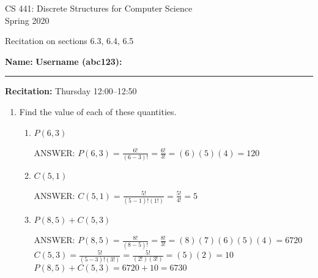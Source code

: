 \documentclass[12pt]{article}
\newcommand\buf{\vspace{0.10in}}
\newenvironment{answer}{\fontfamily{ptm}\selectfont \smaller[1] ANSWER: }{}
\begin{document}
\begin{center}
CS 441: Discrete Structures for Computer Science \\
{\smaller[1] Spring 2020} \\

\vspace {0.25in}

Recitation on sections 6.3, 6.4, 6.5
\end{center}

\vspace{0.25in}

{\smaller[1]
\textbf{Name:} \hrulefill
\hspace{1em}
\textbf{Username (abc123):} \rule{1.25in}{0.4pt}

\null \textbf{Recitation:}
\hfill
Thursday 12:00--12:50 \hfill
}

\begin{enumerate} %


\item Find the value of each of these quantities.

\begin{enumerate}

    \item $P(6, 3)$
    \buf

    \begin{answer}
        $P(6,3) = \frac{6!}{(6-3)!} = \frac{6!}{3!} = (6)(5)(4) = 120$
    \end{answer}
    \buf

    \item $C(5, 1)$
    \buf

    \begin{answer}
        $C(5, 1) = \frac{5!}{(5-1)!(1!)} = \frac{5!}{4!} = 5$
    \end{answer}
    \buf

    \item $P(8, 5) + C(5, 3)$
    \buf

    \begin{answer}
        $P(8,5) = \frac{8!}{(8-5)!} = \frac{8!}{3!} = (8)(7)(6)(5)(4) = 6720$
        $C(5,3) = \frac{5!}{(5-3)!(3!)} = \frac{5!}{(2!)(3!)} = (5)(2) = 10$
        $P(8,5) + C(5, 3) = 6720 + 10 = 6730$
    \end{answer}
    \buf

\end{enumerate}



\end{enumerate}
\end{document}
